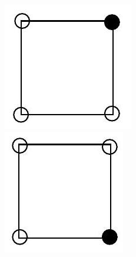 \documentclass[10pt]{article}
\begin{document}
\includegraphics[max width=\textwidth, center]{2025_09_05_3ba26226ec0baddb5a03g-50(14)}\\
\includegraphics[max width=\textwidth, center]{2025_09_05_3ba26226ec0baddb5a03g-50(6)}\\
\end{document}
